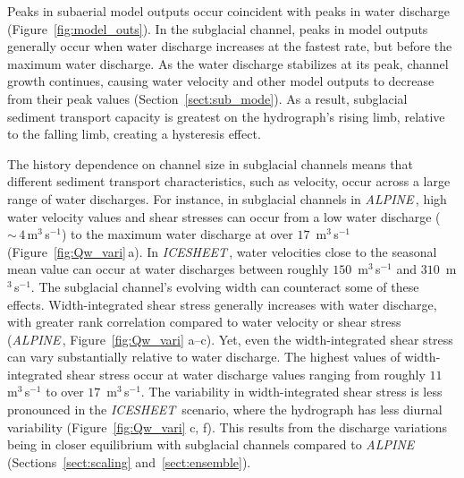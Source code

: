 \documentclass[tc, manuscript]{copernicus}
\newcommand{\alpine}{\textit{ALPINE}\,}
\newcommand{\icesheet}{\textit{ICESHEET}\,}
\begin{document}
Peaks in subaerial model outputs occur coincident with peaks in water discharge (Figure~\ref{fig:model_outs}).
In the subglacial channel, peaks in model outputs generally occur when water discharge increases at the fastest rate, but before the maximum water discharge.
As the water discharge stabilizes at its peak, channel growth continues, causing water velocity and other model outputs to decrease from their peak values (Section~\ref{sect:sub_mode}).
As a result, subglacial sediment transport capacity is greatest on the hydrograph's rising limb, relative to the falling limb, creating a hysteresis effect.

The history dependence on channel size in subglacial channels means that different sediment transport characteristics, such as velocity, occur across a large range of water discharges.
For instance, in subglacial channels in \alpine{},  high water velocity values and shear stresses can occur from a low water discharge  ($\sim\,4$\,\unit{m}$^3$\,\unit{s}$^{-1}$) to the maximum water discharge at over $17$ \,\unit{m}$^3$\,\unit{s}$^{-1}$ (Figure~\ref{fig:Qw_vari}\,a).
In \icesheet{}, water velocities close to the seasonal mean value can occur at water discharges between roughly $150$ \,\unit{m}$^3$\,\unit{s}$^{-1}$ and $310$ \,\unit{m}$^3$\,\unit{s}$^{-1}$.
The subglacial channel's evolving width can counteract some of these effects.
Width-integrated shear stress generally increases with water discharge, with greater rank correlation compared to water velocity or shear stress (\alpine{}, Figure~\ref{fig:Qw_vari} a--c).
Yet, even the width-integrated shear stress can vary substantially relative to water discharge.
The highest values of width-integrated shear stress occur at water discharge values ranging from roughly $11$ \,\unit{m}$^3$\,\unit{s}$^{-1}$ to over $17$ \,\unit{m}$^3$\,\unit{s}$^{-1}$.
The variability in width-integrated shear stress is less pronounced in the \icesheet{} scenario, where the hydrograph has less diurnal variability (Figure~\ref{fig:Qw_vari} c, f).
This results from the discharge variations being in closer equilibrium with subglacial channels compared to \alpine{} (Sections~\ref{sect:scaling} and~\ref{sect:ensemble}).
\end{document}
